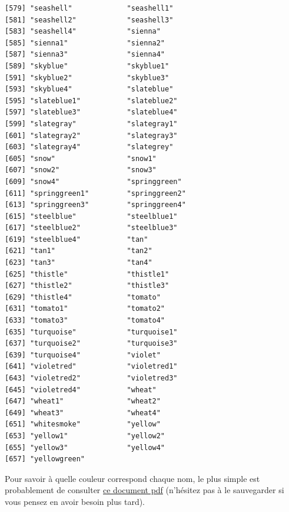 \documentclass[a4paperpaper,]{article}
\begin{document}
\begin{verbatim}
[579] "seashell"             "seashell1"           
[581] "seashell2"            "seashell3"           
[583] "seashell4"            "sienna"              
[585] "sienna1"              "sienna2"             
[587] "sienna3"              "sienna4"             
[589] "skyblue"              "skyblue1"            
[591] "skyblue2"             "skyblue3"            
[593] "skyblue4"             "slateblue"           
[595] "slateblue1"           "slateblue2"          
[597] "slateblue3"           "slateblue4"          
[599] "slategray"            "slategray1"          
[601] "slategray2"           "slategray3"          
[603] "slategray4"           "slategrey"           
[605] "snow"                 "snow1"               
[607] "snow2"                "snow3"               
[609] "snow4"                "springgreen"         
[611] "springgreen1"         "springgreen2"        
[613] "springgreen3"         "springgreen4"        
[615] "steelblue"            "steelblue1"          
[617] "steelblue2"           "steelblue3"          
[619] "steelblue4"           "tan"                 
[621] "tan1"                 "tan2"                
[623] "tan3"                 "tan4"                
[625] "thistle"              "thistle1"            
[627] "thistle2"             "thistle3"            
[629] "thistle4"             "tomato"              
[631] "tomato1"              "tomato2"             
[633] "tomato3"              "tomato4"             
[635] "turquoise"            "turquoise1"          
[637] "turquoise2"           "turquoise3"          
[639] "turquoise4"           "violet"              
[641] "violetred"            "violetred1"          
[643] "violetred2"           "violetred3"          
[645] "violetred4"           "wheat"               
[647] "wheat1"               "wheat2"              
[649] "wheat3"               "wheat4"              
[651] "whitesmoke"           "yellow"              
[653] "yellow1"              "yellow2"             
[655] "yellow3"              "yellow4"             
[657] "yellowgreen"         
\end{verbatim}

Pour savoir à quelle couleur correspond chaque nom, le plus simple est probablement de consulter \href{http://www.stat.columbia.edu/~tzheng/files/Rcolor.pdf}{ce document pdf} (n'hésitez pas à le sauvegarder si vous pensez en avoir besoin plus tard).
\end{document}
